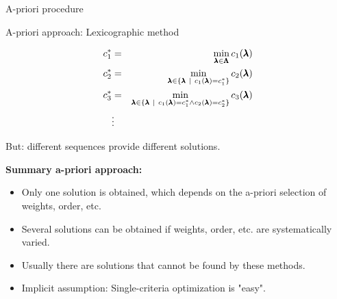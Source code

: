 \begin{frame}[allowframebreaks]{A-priori procedure}
\framebreak

A-priori approach: Lexicographic method

\begin{eqnarray*}
c_1^* &=& \min_{\pmb{\lambda} \in \pmb{\Lambda}} c_1(\pmb{\lambda})\\
c_2^* &=& \min_{\pmb{\lambda} \in \{\pmb{\lambda} ~|~ c_1(\pmb{\lambda}) = c_1^*\}} c_2(\pmb{\lambda}) \\
c_3^* &=& \min_{\pmb{\lambda} \in \{\pmb{\lambda} ~|~ c_1(\pmb{\lambda}) = c_1^* \land c_2(\pmb{\lambda}) = c_2^*\}} c_3(\pmb{\lambda}) \\
&\vdots&
\end{eqnarray*}

But: different sequences provide different solutions.

\framebreak

\textbf{Summary a-priori approach:}
\begin{itemize}
\item Only one solution is obtained, which depends on the a-priori selection of weights, order, etc.
\item Several solutions can be obtained if weights, order, etc. are systematically varied.
\item Usually there are solutions that cannot be found by these methods.
\item Implicit assumption: Single-criteria optimization is "easy".
\end{itemize}

\end{frame}


